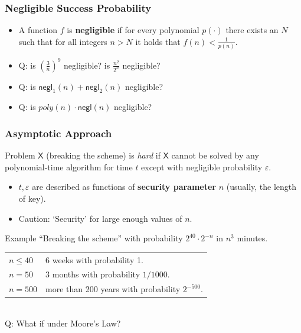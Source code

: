 \begin{frame}\frametitle{Negligible Success Probability}
\begin{itemize}
\item A function $f$ is \textbf{negligible} if for every polynomial $p(\cdot)$
there exists an $N$ such that for all integers $n > N$ it holds that $f(n) < \frac{1}{p(n)}$.
\item \alert{Q: is $\left( \frac{3}{n} \right)^{9}$ negligible? is $\frac{n^{2}}{2^{n}}$ negligible?}
\item \alert{Q: is $ \mathsf{negl}_1(n)+\mathsf{negl}_2(n)$ negligible?}
\item \alert{Q: is $ poly(n)\cdot\mathsf{negl}(n)$ negligible?}
\end{itemize}
\end{frame}
\begin{frame}\frametitle{Asymptotic Approach}
Problem $\mathsf{X}$ (breaking the scheme) is \emph{hard} if $\mathsf{X}$ cannot be solved by any polynomial-time algorithm for time $t$ except with negligible probability $\varepsilon$.
\begin{itemize}
\item $t, \varepsilon$ are described as functions of \textbf{security parameter} $n$ (usually, the length of key).%
\item \alert{Caution}: `Security' for large enough values of $n$.
\end{itemize}
\begin{exampleblock}{Example}
``Breaking the scheme'' with probability $2^{40}\cdot 2^{-n}$ in $n^3$ minutes.
\begin{tabular}{ll}
$n \le 40$ & 6 weeks with probability 1. \\
$n=50$   & 3 months with probability $1/1000$. \\
$n=500$  & more than 200 years with probability $2^{-500}$. \\
\end{tabular}\\

\alert{Q: What if under Moore's Law?} 
\end{exampleblock}
\end{frame}

